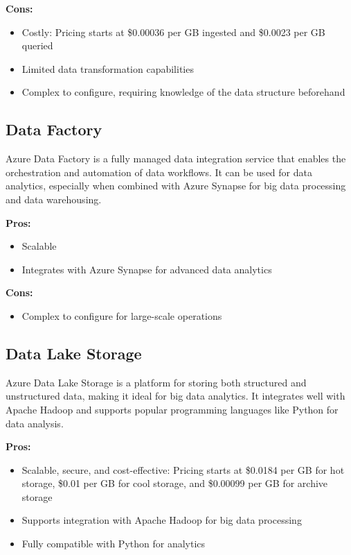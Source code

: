 \textbf{Cons:}
\begin{itemize}
    \item Costly: Pricing starts at \$0.00036 per GB ingested and \$0.0023 per GB queried
    \item Limited data transformation capabilities
    \item Complex to configure, requiring knowledge of the data structure beforehand
\end{itemize}

\subsection*{Data Factory}
\label{azure:data-factory}
Azure Data Factory is a fully managed data integration service that enables the orchestration and automation of data workflows. It can be used for data analytics, especially when combined with Azure Synapse for big data processing and data warehousing.

\textbf{Pros:}
\begin{itemize}
    \item Scalable
    \item Integrates with Azure Synapse for advanced data analytics
\end{itemize}

\textbf{Cons:}
\begin{itemize}
    \item Complex to configure for large-scale operations
\end{itemize}

\subsection*{Data Lake Storage}
\label{azure:data-lake-storage}
Azure Data Lake Storage is a platform for storing both structured and unstructured data, making it ideal for big data analytics. It integrates well with Apache Hadoop and supports popular programming languages like Python for data analysis.

\textbf{Pros:}
\begin{itemize}
    \item Scalable, secure, and cost-effective: Pricing starts at \$0.0184 per GB for hot storage, \$0.01 per GB for cool storage, and \$0.00099 per GB for archive storage
    \item Supports integration with Apache Hadoop for big data processing
    \item Fully compatible with Python for analytics
\end{itemize}

